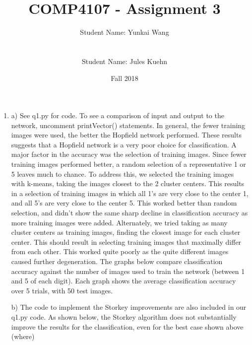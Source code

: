\documentclass[11pt]{article}
\title{COMP4107 - Assignment 3}
\author{Student Name: Yunkai Wang\\
\text{Student Number: 100968473}\\\\
Student Name: Jules Kuehn\\
\text{Student Number: 100661464}}
\date{Fall 2018}
\begin{document}
\maketitle
\begin{enumerate}

\item
a) See q1.py for code. To see a comparison of input and output to the network, uncomment printVector() statements.\newline
\newline
In general, the fewer training images were used, the better the Hopfield network performed. These results suggests that a Hopfield network is a very poor choice for classification.\newline
A major factor in the accuracy was the selection of training images. Since fewer training images performed better, a random selection of a representative 1 or 5 leaves much to chance. To address this, we selected the training images with k-means, taking the images closest to the 2 cluster centers. This results in a selection of training images in which all 1's are very close to the center 1, and all 5's are very close to the center 5. This worked better than random selection, and didn't show the same sharp decline in classification accuracy as more training images were added.\newline
Alternately, we tried taking as many cluster centers as training images, finding the closest image for each cluster center. This should result in selecting training images that maximally differ from each other. This worked quite poorly as the quite different images caused further degeneration.\newline
The graphs below compare classification accuracy against the number of images used to train the network (between 1 and 5 of each digit). Each graph shows the average classification accuracy over 5 trials, with 50 test images.
% 

b) The code to implement the Storkey improvements are also included in our q1.py code.\newline
\newline
As shown below, the Storkey algorithm does not substantially improve the results for the classification, even for the best case shown above (where)
% 



\end{enumerate}
\end{document}
